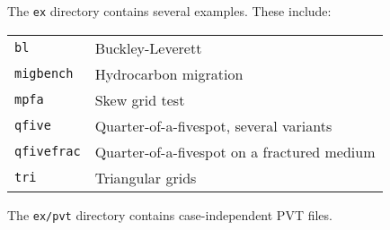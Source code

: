 

The \texttt{ex} directory contains several examples. These include:

\begin{tabular}[c]{ll}
  \texttt{bl} & Buckley-Leverett \\
  \texttt{migbench} & Hydrocarbon migration \\
  \texttt{mpfa} & Skew grid test \\
  \texttt{qfive} & Quarter-of-a-fivespot, several variants \\
  \texttt{qfivefrac} & Quarter-of-a-fivespot on a fractured medium \\
  \texttt{tri} & Triangular grids
\end{tabular}

The \texttt{ex/pvt} directory contains case-independent PVT files.

